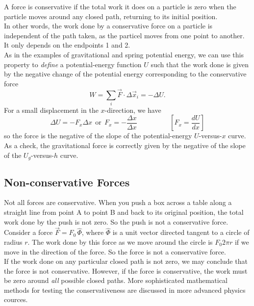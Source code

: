 \documentclass[11pt,a4paper]{report}
\begin{document}
A force is conservative if the total work it does on a particle is zero when the particle moves around any closed path, returning to its initial position.
\\In other words, the work done by a conservative force on a particle is independent of the path taken, as the particel moves from one point to another. It only depends on the endpoints 1 and 2.
\\As in the examples of gravitational and spring potential energy, we can use this property to \textit{define} a potential-energy function $U$ such that the work done is given by the negative change of the potential energy corresponding to the conservative force $$W = \sum_i \vec{F} \cdot \Delta{\vec{x}_i} = -\Delta{U}.$$
For a small displacement in the $x$-direction, we have $$\Delta{U} = -F_x \Delta{x} \mathrm{\ \ or\ \ } F_x = -\frac{\Delta{x}}{\Delta{x}} \hspace{2cm} \left[F_x = \frac{dU}{dx}\right]$$ so the force is the negative of the slope of the potential-energy $U$-versus-$x$ curve.
\\As a check, the gravitational force is correctly given by the negative of the slope of the $U_g$-versus-$h$ curve.

\subsection{Non-conservative Forces}
Not all forces are conservative. When you push a box across a table along a straight line from point A to point B and back to its original position, the total work done by the push is not zero. So the push is not a conservative force.
\\Consider a force $\vec{F} = F_0\,\hat{\Phi}$, where $\hat{\Phi}$ is a unit vector directed tangent to a circle of radius $r$. The work done by this force as we move around the circle is $F_0 2\pi r$ if we move in the direction of the force. So the force is not a conservative force.
\\If the work done on any particular closed path is not zero, we may conclude that the force is not conservative. However, if the force is conservative, the work must be zero around \textit{all} possible closed paths. More sophisticated mathematical methods for testing the conservativeness are discussed in more advanced physics cources.
\end{document}
